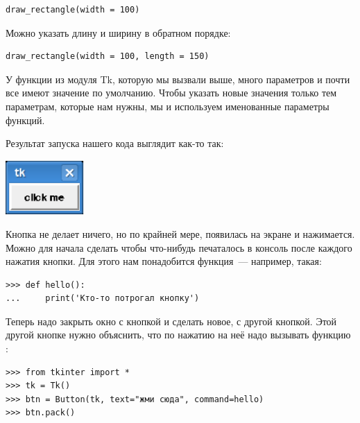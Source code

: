 \begin{listing}
\begin{verbatim}
draw_rectangle(width = 100)
\end{verbatim}
\end{listing}

Можно указать длину и ширину в обратном порядке:

\begin{listing}
\begin{verbatim}
draw_rectangle(width = 100, length = 150)
\end{verbatim}
\end{listing}

У функции  из модуля Tk, которую мы вызвали выше, много параметров и почти все имеют значение по умолчанию. Чтобы указать новые значения только тем параметрам, которые нам нужны, мы и используем именованные параметры функций.


Результат запуска нашего кода выглядит как-то так:

\begin{center}
\includegraphics*[width=30mm]{../en/figure31.eps}
\end{center}

Кнопка не делает ничего, но по крайней мере, появилась на экране и нажимается. Можно для начала сделать чтобы что-нибудь печаталось в консоль после каждого нажатия кнопки. Для этого нам понадобится функция — например, такая:

\begin{listing}
\begin{verbatim}
>>> def hello():
...     print('Кто-то потрогал кнопку')
\end{verbatim}
\end{listing}

Теперь надо закрыть окно с кнопкой и сделать новое, с другой кнопкой. Этой другой кнопке нужно объяснить, что по нажатию на неё надо вызывать функцию :

\begin{listing}
\begin{verbatim}
>>> from tkinter import *
>>> tk = Tk()
>>> btn = Button(tk, text="жми сюда", command=hello)
>>> btn.pack()
\end{verbatim}
\end{listing}

